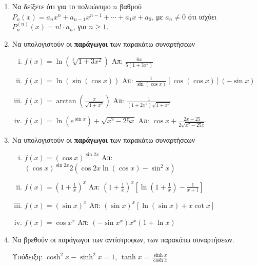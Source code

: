 \begin{enumerate}
  \item Να δείξετε ότι για το πολυώνυμο $n$ βαθμού $ P_{n}(x) =a_{n}x^{n} +
    a_{n-1}x^{n-1} + \cdots + a_{1}x + a_{0} $, με  $ a_{n}\neq 0 $ ότι ισχύει $
    P_{n}^{(n)}(x) = n! \cdot a_{n}$, για  $n\geq 1 $.

  \item Να υπολογιστούν οι \textbf{παράγωγοι} των παρακάτω συναρτήσεων
    \begin{enumerate}[(i)]
      \item $ f(x) = \ln{\left(\sqrt[5]{1+3x^{2}}\right)} $ \hfill Απ: $
        \frac{6x}{5(1+3x^{2})} $
      \item $ f(x) = \ln({\sin({\cos{x}})}) $ \hfill Απ: $
        \frac{1}{\sin{(\cos{x})}} [\cos{(\cos{x})}] (- \sin{x}) $ 
      \item $ f(x) = \arctan{\left(\frac{x}{\sqrt{1 + x^{2}}}\right)} $ \hfill Απ: $
        \frac{1}{(1+2x^{2})\sqrt{1 + x^{2}}} $
      \item $ f(x) = \ln{(e^{\sin{x}})} + \sqrt{x^{2} - 25x} $ \hfill Απ: $
        \cos{x} + \frac{2x - 25}{2 \sqrt{x^{2} - 25x}}  $  
    \end{enumerate}

  \item  Να υπολογιστούν οι \textbf{παράγωγοι} των παρακάτω συναρτήσεων

    \begin{enumerate}[(i)]
      \item $ f(x) = (\cos{x})^{\sin{2x}} $ \hfill Απ: $
        (\cos{x})^{\sin{2x}} 2(\cos{2x} \ln{(\cos{x})} - \sin^{2}{x}) $
      \item $ f(x) = \left(1 + \frac{1}{x} \right)^{x} $ \hfill Απ: $
        \left(1 + \frac{1}{x}\right)^{x}\left[\ln{(1 + \frac{1}{x})} -
        \frac{1}{x+1}\right] $
      \item $ f(x)=(\sin{x})^{x} $ \hfill Απ: $ (\sin{x})^{x}[\ln{(\sin{x}
        )} + x \cot{x}] $ 
      \item $ f(x)=\cos{x}^{x} $ \hfill Απ: $ (- \sin{x^{x}})x^{x} (1 +
        \ln{x}) $
    \end{enumerate}

  \item Να βρεθούν οι παράγωγοι των αντίστροφων, των παρακάτω συναρτήσεων.

    \textcolor{Col1}{Υπόδειξη:} 
      $ \cosh^{2}{x} - \sinh^{2}{x} = 1 $, \;
      $ \tanh{x} = \frac{\sinh{x}}{\cosh{x}} $ 
    \begin{enumerate}[(i)]
    \end{enumerate}


\end{enumerate}
